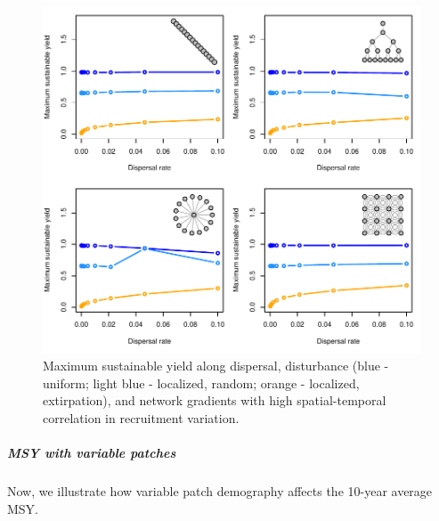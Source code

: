 \documentclass[]{article}
\let\oldsubparagraph\subparagraph
\renewcommand{\subparagraph}[1]{\oldsubparagraph{#1}\mbox{}}
\begin{document}
\begin{figure}[H]

{\centering \includegraphics{Managing_for_ecological_surprises_in_metapopulations_makeHTML_files/figure-latex/MSY-1} 

}

\caption{Maximum sustainable yield along dispersal, disturbance (blue - uniform; light blue - localized, random; orange - localized, extirpation), and network gradients with high spatial-temporal correlation in recruitment variation.}\label{fig:MSY}
\end{figure}

\subparagraph{MSY with variable
patches}\label{msy-with-variable-patches}

Now, we illustrate how variable patch demography affects the 10-year
average MSY.
\end{document}
